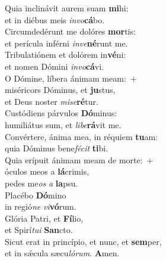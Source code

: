 \evenverse Quia inclinávit aurem suam \textbf{mi}hi:~\*\\
\evenverse et in diébus meis \textit{in}\textit{vo}\textbf{cá}bo.\\
\oddverse Circumdedérunt me dolóres \textbf{mor}tis:~\*\\
\oddverse et perícula inférni \textit{in}\textit{ve}\textbf{né}runt me.\\
\evenverse Tribulatiónem et dolórem in\textbf{vé}ni:~\*\\
\evenverse et nomen Dómini \textit{in}\textit{vo}\textbf{cá}vi.\\
\oddverse O Dómine, líbera ánimam meam:~+\\
\oddverse  miséricors Dóminus, et \textbf{ju}stus,~\*\\
\oddverse et Deus noster \textit{mi}\textit{se}\textbf{ré}tur.\\
\evenverse Custódiens párvulos \textbf{Dó}minus:~\*\\
\evenverse humiliátus sum, et \textit{li}\textit{be}\textbf{rá}vit me.\\
\oddverse Convértere, ánima mea, in réquiem \textbf{tu}am:~\*\\
\oddverse quia Dóminus bene\textit{fé}\textit{cit} \textbf{ti}bi.\\
\evenverse Quia erípuit ánimam meam de morte:~+\\
\evenverse  óculos meos a \textbf{lá}crimis,~\*\\
\evenverse pedes me\textit{os} \textit{a} \textbf{la}psu.\\
\oddverse Placébo \textbf{Dó}mino~\*\\
\oddverse in regió\textit{ne} \textit{vi}\textbf{vó}rum.\\
\evenverse Glória Patri, et \textbf{Fí}lio,~\*\\
\evenverse et Spirí\textit{tu}\textit{i} \textbf{San}cto.\\
\oddverse Sicut erat in princípio, et nunc, et \textbf{sem}per,~\*\\
\oddverse et in sǽcula sæcu\textit{ló}\textit{rum}. \textbf{A}men.\\

